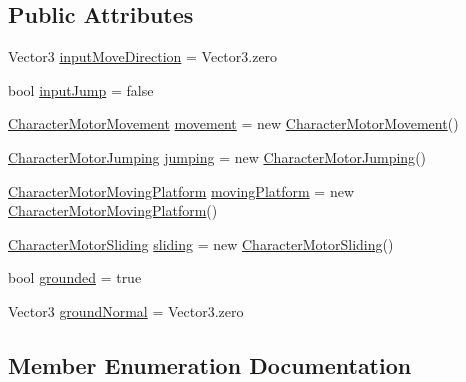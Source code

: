 \subsection*{Public Attributes}
\begin{DoxyCompactItemize}
\item 
Vector3 \hyperlink{class_character_motor_ad0bcb8698b03c87100f137eda3d44778}{input\+Move\+Direction} = Vector3.\+zero
\item 
bool \hyperlink{class_character_motor_a35e7c3109338c4d66e8a0e3e8267eb1c}{input\+Jump} = false
\item 
\hyperlink{class_character_motor_1_1_character_motor_movement}{Character\+Motor\+Movement} \hyperlink{class_character_motor_a4e78119cee0a5fefef9e00fa3e3226e6}{movement} = new \hyperlink{class_character_motor_1_1_character_motor_movement}{Character\+Motor\+Movement}()
\item 
\hyperlink{class_character_motor_1_1_character_motor_jumping}{Character\+Motor\+Jumping} \hyperlink{class_character_motor_ae37632c27e5831d2abebfaf6f3f1090d}{jumping} = new \hyperlink{class_character_motor_1_1_character_motor_jumping}{Character\+Motor\+Jumping}()
\item 
\hyperlink{class_character_motor_1_1_character_motor_moving_platform}{Character\+Motor\+Moving\+Platform} \hyperlink{class_character_motor_a7e1365cba58a6219df462088ee282bbb}{moving\+Platform} = new \hyperlink{class_character_motor_1_1_character_motor_moving_platform}{Character\+Motor\+Moving\+Platform}()
\item 
\hyperlink{class_character_motor_1_1_character_motor_sliding}{Character\+Motor\+Sliding} \hyperlink{class_character_motor_acdffbadbd84cdc50a57ae1675166ceb5}{sliding} = new \hyperlink{class_character_motor_1_1_character_motor_sliding}{Character\+Motor\+Sliding}()
\item 
bool \hyperlink{class_character_motor_a2515921b1c3156e2a4a15a7faf13a222}{grounded} = true
\item 
Vector3 \hyperlink{class_character_motor_a83cfb98714aa374ddef3692ccd8cba2c}{ground\+Normal} = Vector3.\+zero
\end{DoxyCompactItemize}


\subsection{Member Enumeration Documentation}
\hypertarget{class_character_motor_ae8904b1ae7907502123f9376cf77a045}{}
